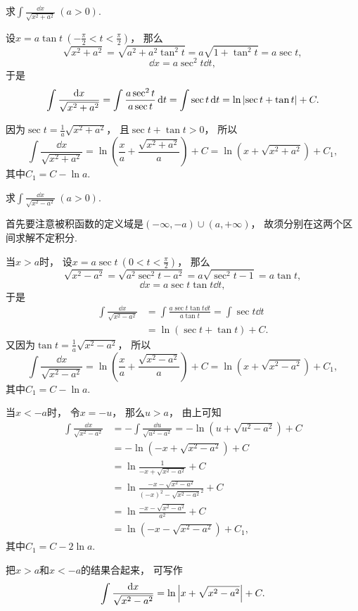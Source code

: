 \begin{example}
求\(\int \frac{\dd{x}}{\sqrt{x^2 + a^2}}\ (a>0)\).
\begin{solution}
设\(x = a \tan t\ (-\frac{\pi}{2} < t < \frac{\pi}{2})\)，
那么\[
	\sqrt{x^2 + a^2}
	= \sqrt{a^2 + a^2 \tan^2 t}
	= a \sqrt{1 + \tan^2 t}
	= a \sec t,
\]\[
	\dd{x} = a \sec^2 t \dd{t},
\]
于是\[
	\int \frac{\dd{x}}{\sqrt{x^2 + a^2}}
	= \int \frac{a \sec^2 t}{a \sec t} \dd{t}
	= \int \sec t \dd{t}
	= \ln\abs{\sec t + \tan t} + C.
\]

因为\(\sec t = \frac{1}{a} \sqrt{x^2 + a^2}\)，
且\(\sec t + \tan t > 0\)，
所以\[
	\int \frac{\dd{x}}{\sqrt{x^2 + a^2}}
	= \ln( \frac{x}{a} + \frac{\sqrt{x^2 + a^2}}{a} ) + C
	= \ln(x + \sqrt{x^2 + a^2}) + C_1,
\]
其中\(C_1 = C - \ln a\).
\end{solution}
\end{example}

\begin{example}
求\(\int \frac{\dd{x}}{\sqrt{x^2 - a^2}}\ (a>0)\).
\begin{solution}
首先要注意被积函数的定义域是\((-\infty,-a)\cup(a,+\infty)\)，
故须分别在这两个区间求解不定积分.

当\(x > a\)时，
设\(x = a \sec t\ (0 < t < \frac{\pi}{2})\)，
那么\[
	\sqrt{x^2 - a^2} = \sqrt{a^2 \sec^2 t - a^2} = a \sqrt{\sec^2 t - 1} = a \tan t,
\]\[
	\dd{x} = a \sec t \tan t \dd{t},
\]
于是\begin{align*}
	\int \frac{\dd{x}}{\sqrt{x^2 - a^2}}
	&= \int \frac{a \sec t \tan t \dd{t}}{a \tan t}
	= \int \sec t \dd{t} \\
	&= \ln(\sec t + \tan t) + C.
\end{align*}
又因为\(\tan t = \frac{1}{a} \sqrt{x^2 - a^2}\)，
所以\[
	\int \frac{\dd{x}}{\sqrt{x^2 - a^2}}
	= \ln( \frac{x}{a} + \frac{\sqrt{x^2 - a^2}}{a} ) + C
	= \ln( x + \sqrt{x^2 - a^2} ) + C_1,
\]
其中\(C_1 = C - \ln a\).

当\(x < -a\)时，
令\(x = -u\)，
那么\(u > a\)，
由上可知\begin{align*}
	\int \frac{\dd{x}}{\sqrt{x^2 - a^2}}
	&= -\int \frac{\dd{u}}{\sqrt{u^2 - a^2}}
	= -\ln(u + \sqrt{u^2 - a^2}) + C \\
	&= -\ln(-x + \sqrt{x^2 - a^2}) + C \\
	&= \ln\frac{1}{-x + \sqrt{x^2 - a^2}} + C \\
	&= \ln\frac{-x - \sqrt{x^2 - a^2}}{(-x)^2 - \sqrt{x^2 - a^2}^2} + C \\
	&= \ln\frac{-x - \sqrt{x^2 - a^2}}{a^2} + C \\
	&= \ln(-x - \sqrt{x^2 - a^2}) + C_1,
\end{align*}
其中\(C_1 = C - 2 \ln a\).

把\(x > a\)和\(x < -a\)的结果合起来，
可写作\[
	\int \frac{\dd{x}}{\sqrt{x^2 - a^2}}
	= \ln\abs{x + \sqrt{x^2 - a^2}} + C.
\]
\end{solution}
\end{example}

